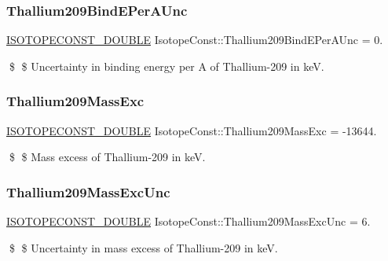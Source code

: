 \subsubsection{\texorpdfstring{Thallium209\+Bind\+E\+Per\+A\+Unc}{Thallium209BindEPerAUnc}}
{\footnotesize\ttfamily \mbox{\hyperlink{group___isotope_const-_macros_ga8f45a7272ce02c0b4c65c44636ed719a}{I\+S\+O\+T\+O\+P\+E\+C\+O\+N\+S\+T\+\_\+\+D\+O\+U\+B\+LE}} Isotope\+Const\+::\+Thallium209\+Bind\+E\+Per\+A\+Unc = 0.}

\$ \$ Uncertainty in binding energy per A of Thallium-\/209 in keV. \mbox{\label{group___isotope_const-_thallium-_tl209_gac62d1bdfe1f9acd9d8af6a6a9293f087}} 
\subsubsection{\texorpdfstring{Thallium209\+Mass\+Exc}{Thallium209MassExc}}
{\footnotesize\ttfamily \mbox{\hyperlink{group___isotope_const-_macros_ga8f45a7272ce02c0b4c65c44636ed719a}{I\+S\+O\+T\+O\+P\+E\+C\+O\+N\+S\+T\+\_\+\+D\+O\+U\+B\+LE}} Isotope\+Const\+::\+Thallium209\+Mass\+Exc = -\/13644.}

\$ \$ Mass excess of Thallium-\/209 in keV. \mbox{\label{group___isotope_const-_thallium-_tl209_ga10a7d624f23c079a6b3b29a4f34aa625}} 
\subsubsection{\texorpdfstring{Thallium209\+Mass\+Exc\+Unc}{Thallium209MassExcUnc}}
{\footnotesize\ttfamily \mbox{\hyperlink{group___isotope_const-_macros_ga8f45a7272ce02c0b4c65c44636ed719a}{I\+S\+O\+T\+O\+P\+E\+C\+O\+N\+S\+T\+\_\+\+D\+O\+U\+B\+LE}} Isotope\+Const\+::\+Thallium209\+Mass\+Exc\+Unc = 6.}

\$ \$ Uncertainty in mass excess of Thallium-\/209 in keV. \mbox{\label{group___isotope_const-_thallium-_tl209_ga88620948db3f263e3ddc749bd5e8a47f}} 
